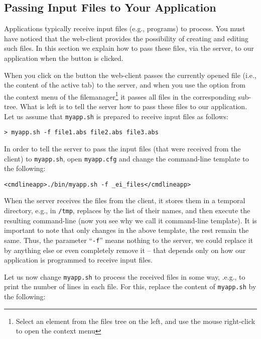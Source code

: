 \subsection{Passing Input Files to Your Application}

Applications typically receive input files (e.g., programs) to
process. You must have noticed that the web-client provides the
possibility of creating and editing such files.  In this section we
explain how to pass these files, via the server, to our application
when the \applybutton button is clicked.

When you click on the \applybutton button the web-client passes the
currently opened file (i.e., the content of the active tab) to the
server, and when you use the \applybutton option from the context menu
of the filemanager\footnote{Select an element from the files tree on
  the left, and use the mouse right-click to open the context menu} it
passes all files in the corresponding sub-tree.
%
What is left is to tell the server how to pass these files to our
application. Let us assume that \texttt{myapp.sh} is prepared to
receive input files as follows:

\medskip
\begin{lstlisting}
> myapp.sh -f file1.abs file2.abs file3.abs
\end{lstlisting}

\medskip 
\noindent
In order to tell the server to pass the input files (that were
received from the client) to \texttt{myapp.sh}, open
\texttt{myapp.cfg} and change the command-line template to the
following:

\medskip
\begin{lstlisting}
<cmdlineapp>./bin/myapp.sh -f _ei_files</cmdlineapp>
\end{lstlisting}

\medskip
\noindent
When the server receives the files from the client, it stores them in
a temporal directory, e.g., in \texttt{/tmp}, replaces 
by the list of their names, and then execute the resulting
command-line (now you see why we call it command-line template).
%
It is important to note that only  changes in the above
template, the rest remain the same. Thus, the parameter
``\texttt{-f}'' means nothing to the server, we could replace it by
anything else or even completely remove it -- that depends only on how
our application is programmed to receive input files.

Let us now change \texttt{myapp.sh} to process the received files in
some way, .e.g., to print the number of lines in each file. For this,
replace the content of \texttt{myapp.sh} by the following:


